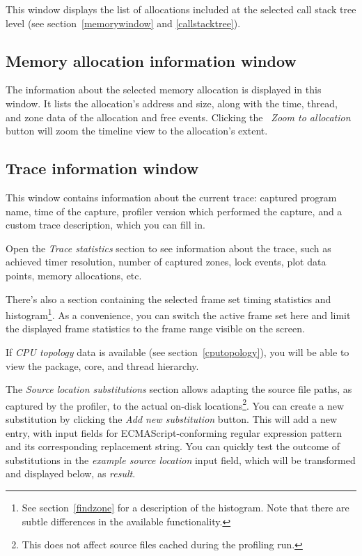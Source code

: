 \documentclass[hidelinks,titlepage,a4paper]{article}
\begin{document}
This window displays the list of allocations included at the selected call stack tree level (see section~\ref{memorywindow} and \ref{callstacktree}).

\subsection{Memory allocation information window}
\label{memallocinfo}

The information about the selected memory allocation is displayed in this window. It lists the allocation's address and size, along with the time, thread, and zone data of the allocation and free events. Clicking the \emph{\faMicroscope{}~Zoom to allocation} button will zoom the timeline view to the allocation's extent.

\subsection{Trace information window}
\label{traceinfo}

This window contains information about the current trace: captured program name, time of the capture, profiler version which performed the capture, and a custom trace description, which you can fill in.

Open the \emph{Trace statistics} section to see information about the trace, such as achieved timer resolution, number of captured zones, lock events, plot data points, memory allocations, etc.

There's also a section containing the selected frame set timing statistics and histogram\footnote{See section~\ref{findzone} for a description of the histogram. Note that there are subtle differences in the available functionality.}. As a convenience, you can switch the active frame set here and limit the displayed frame statistics to the frame range visible on the screen.

If \emph{CPU topology} data is available (see section~\ref{cputopology}), you will be able to view the package, core, and thread hierarchy.

The \emph{Source location substitutions} section allows adapting the source file paths, as captured by the profiler, to the actual on-disk locations\footnote{This does not affect source files cached during the profiling run.}. You can create a new substitution by clicking the \emph{Add new substitution} button. This will add a new entry, with input fields for ECMAScript-conforming regular expression pattern and its corresponding replacement string. You can quickly test the outcome of substitutions in the \emph{example source location} input field, which will be transformed and displayed below, as \emph{result}.
\end{document}
